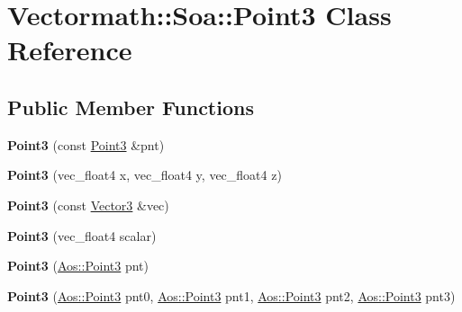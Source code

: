 \hypertarget{classVectormath_1_1Soa_1_1Point3}{\section{Vectormath\-:\-:Soa\-:\-:Point3 Class Reference}
\label{classVectormath_1_1Soa_1_1Point3}
}
\subsection*{Public Member Functions}
\begin{DoxyCompactItemize}
\item 
\hypertarget{classVectormath_1_1Soa_1_1Point3_aab495c0f0e3246b4505fb1539ba43fba}{{\bfseries Point3} (const \hyperlink{classVectormath_1_1Soa_1_1Point3}{Point3} \&pnt)}\label{classVectormath_1_1Soa_1_1Point3_aab495c0f0e3246b4505fb1539ba43fba}

\item 
\hypertarget{classVectormath_1_1Soa_1_1Point3_afa048556fb5733155f7570b98041c6aa}{{\bfseries Point3} (vec\-\_\-float4 x, vec\-\_\-float4 y, vec\-\_\-float4 z)}\label{classVectormath_1_1Soa_1_1Point3_afa048556fb5733155f7570b98041c6aa}

\item 
\hypertarget{classVectormath_1_1Soa_1_1Point3_a069cd5b9fcba74fd59d31745b43fd6cd}{{\bfseries Point3} (const \hyperlink{classVectormath_1_1Soa_1_1Vector3}{Vector3} \&vec)}\label{classVectormath_1_1Soa_1_1Point3_a069cd5b9fcba74fd59d31745b43fd6cd}

\item 
\hypertarget{classVectormath_1_1Soa_1_1Point3_a218e3dfa22fd1586999dc4a9a6839607}{{\bfseries Point3} (vec\-\_\-float4 scalar)}\label{classVectormath_1_1Soa_1_1Point3_a218e3dfa22fd1586999dc4a9a6839607}

\item 
\hypertarget{classVectormath_1_1Soa_1_1Point3_a7e914a6b7473102541aaa17017b62050}{{\bfseries Point3} (\hyperlink{classVectormath_1_1Aos_1_1Point3}{Aos\-::\-Point3} pnt)}\label{classVectormath_1_1Soa_1_1Point3_a7e914a6b7473102541aaa17017b62050}

\item 
\hypertarget{classVectormath_1_1Soa_1_1Point3_a59166c3fd55027427b8c2e130a71e907}{{\bfseries Point3} (\hyperlink{classVectormath_1_1Aos_1_1Point3}{Aos\-::\-Point3} pnt0, \hyperlink{classVectormath_1_1Aos_1_1Point3}{Aos\-::\-Point3} pnt1, \hyperlink{classVectormath_1_1Aos_1_1Point3}{Aos\-::\-Point3} pnt2, \hyperlink{classVectormath_1_1Aos_1_1Point3}{Aos\-::\-Point3} pnt3)}\label{classVectormath_1_1Soa_1_1Point3_a59166c3fd55027427b8c2e130a71e907}


\end{DoxyCompactItemize}
